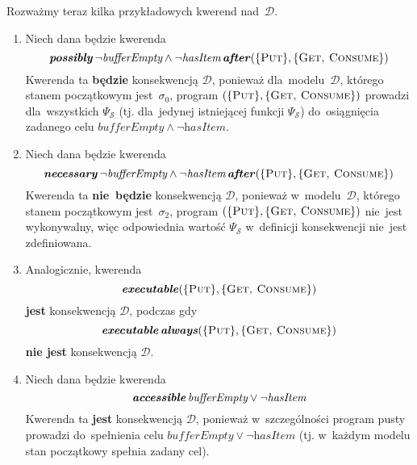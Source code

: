\documentclass[11pt,a4paper]{article}
\DeclareMathOperator{\After}{\textbf{\textit{after}}}
\DeclareMathOperator{\Always}{\textbf{\textit{always}}}
\DeclareMathOperator{\Executable}{\textbf{\textit{executable}}}
\DeclareMathOperator{\Accessible}{\textbf{\textit{accessible}}}
\DeclareMathOperator{\Possibly}{\textbf{\textit{possibly}}}
\DeclareMathOperator{\Necessary}{\textbf{\textit{necessary}}}
\begin{document}
Rozważmy teraz kilka przykładowych kwerend nad~$\mathcal{D}$.

\begin{enumerate}
    \item Niech dana będzie kwerenda
    $$ \Possibly \neg \textit{bufferEmpty} \land \neg \textit{hasItem} \After (\{ \textsc{Put} \}, \{ \textsc{Get, Consume} \}) $$
    Kwerenda ta \textbf{będzie} konsekwencją $\mathcal{D}$, ponieważ dla~modelu~$\mathcal{D}$, którego stanem początkowym jest~$\sigma_0$, program $(\{ \textsc{Put} \}, \{ \textsc{Get, Consume} \})$ prowadzi dla~wszystkich $\Psi_\mathcal{S}$ (tj. dla~jedynej istniejącej funkcji $\Psi_\mathcal{S}$) do~osiągnięcia zadanego celu $\textit{bufferEmpty} \land \neg \textit{hasItem}$.

    \item Niech dana będzie kwerenda
    $$ \Necessary \neg \textit{bufferEmpty} \land \neg \textit{hasItem} \After (\{ \textsc{Put} \}, \{ \textsc{Get, Consume} \}) $$
    Kwerenda ta \textbf{nie~będzie} konsekwencją $\mathcal{D}$, ponieważ w~modelu~$\mathcal{D}$, którego stanem początkowym jest~$\sigma_2$, program $(\{ \textsc{Put} \}, \{ \textsc{Get, Consume} \})$ nie~jest wykonywalny, więc odpowiednia wartość $\Psi_\mathcal{S}$ w~definicji konsekwencji nie~jest zdefiniowana.

    \item Analogicznie, kwerenda
    $$\Executable (\{ \textsc{Put} \}, \{ \textsc{Get, Consume} \})$$
    \textbf{jest} konsekwencją $\mathcal{D}$, podczas gdy
    $$\Executable \Always (\{ \textsc{Put} \}, \{ \textsc{Get, Consume} \})$$
    \textbf{nie jest} konsekwencją $\mathcal{D}$.

    \item Niech dana będzie kwerenda
    $$ \Accessible \textit{bufferEmpty} \lor \neg \textit{hasItem} $$
    Kwerenda ta \textbf{jest} konsekwencją $\mathcal{D}$, ponieważ w~szczególności program pusty prowadzi do~spełnienia celu $\textit{bufferEmpty} \lor \neg \textit{hasItem}$ (tj. w~każdym modelu stan początkowy spełnia zadany cel).
\end{enumerate}
\end{document}
